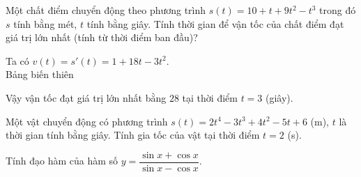 \begin{ex}%
Một chất điểm chuyển động theo phương trình $s \left(t \right)=10+t+9t^2-t^3$ trong đó $s$ tính bằng mét, $t$ tính bằng giây. Tính thời gian để vận tốc của chất điểm đạt giá trị lớn nhất (tính từ thời điểm ban đầu)?
\loigiai
{
Ta có $v(t)=s'(t)=1+18t-3t^2$.\\
Bảng biến thiên
\begin{center}
\end{center}
Vậy vận tốc đạt giá trị lớn nhất bằng $28$ tại thời điểm $t=3$ (giây).
}
\end{ex}

\begin{bt}%
Một vật chuyển động có phương trình $s(t)=2t^4-3t^3+4t^2-5t+6$ (m), $t$ là thời gian tính bằng giây. Tính gia tốc của vật tại thời điểm $t=2$ (s).
\end{bt}

\begin{bt}%
Tính đạo hàm của hàm số $y=\dfrac{\sin x+\cos x}{\sin x-\cos x}$.
\end{bt}

